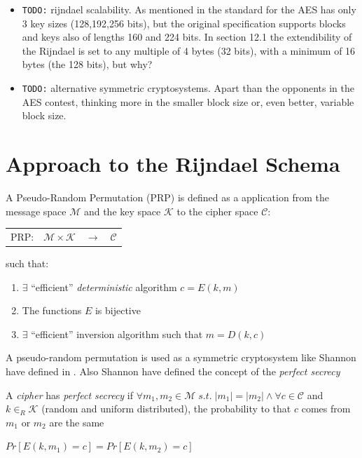 \documentclass[10pt,a4paper,twoside]{llncs}
\begin{document}
\begin{itemize}
 \item \texttt{TODO:} rijndael scalability. As mentioned in \cite{Daemen01aes-ammended} the standard for the AES has only 3 key sizes (128,192,256 bits), but the original specification supports blocks and keys also of lengths 160 and 224 bits. In section 12.1 the extendibility of the Rijndael is set to any multiple of 4 bytes (32 bits), with a minimum of 16 bytes (the 128 bits), but why?
\end{itemize}

\begin{itemize}
 \item \texttt{TODO:} alternative symmetric cryptosystems. Apart than the opponents in the AES contest, thinking more in the smaller block size or, even better, variable block size.
\end{itemize}

\section{Approach to the Rijndael Schema}\label{sec:approach}
\begin{definition}\label{def:PRP}
 A Pseudo-Random Permutation (PRP) is defined as a application from the message space $\mathcal{M}$ and the key space $\mathcal{K}$ to the cipher space $\mathcal{C}$:
 \begin{center}
  \begin{tabular}{llll}
   PRP: & $\mathcal{M} \times \mathcal{K}$ & $\rightarrow$ & $\mathcal{C}$ \\
  \end{tabular}
 \end{center}
 such that:
 \begin{enumerate}
  \item $\exists$ ``efficient'' \emph{deterministic} algorithm $c=E(k,m)$
  \item The functions $E$ is bijective
  \item $\exists$ ``efficient'' inversion algorithm such that $m=D(k,c)$
 \end{enumerate}
\end{definition}

A pseudo-random permutation is used as a symmetric cryptosystem like Shannon have defined in \cite{shannon-comTheorySecSys}. Also Shannon have defined the concept of the \emph{perfect secrecy}
\begin{definition}\label{def:shannonPerfectSecrecy}
 A \emph{cipher} has \emph{perfect secrecy} if $\forall m_1, m_2 \in \mathcal{M} \;s.t.\; \left| m_1 \right| = \left| m_2 \right| \wedge \forall c \in \mathcal{C}$ and  $k\in_R\mathcal{K}$ (random and uniform distributed), the probability to that $c$ comes from $m_1$ or $m_2$ are the same
 \begin{center}
  $Pr[E(k,m_1)=c] = Pr[E(k,m_2)=c]$
 \end{center}
\end{definition}
\end{document}
